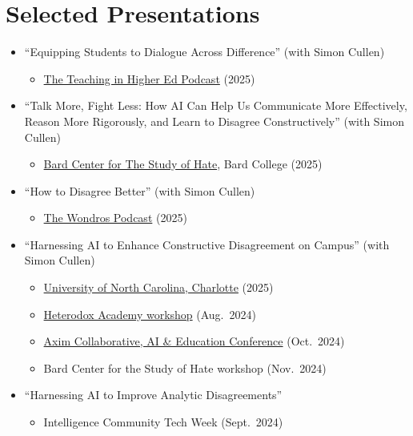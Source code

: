 \documentclass[11pt,letterpaper]{article}
\begin{document}
\section*{Selected Presentations}
\begin{itemize}
    \item ``Equipping Students to Dialogue Across Difference'' (with Simon Cullen)
    \begin{itemize}
        \item \href{https://teachinginhighered.com/podcast/equip-students-to-dialog-across-differences-using-an-ai-guide/}{The Teaching in Higher Ed Podcast} (2025)
    \end{itemize}

    \item ``Talk More, Fight Less: How AI Can Help Us Communicate More Effectively, Reason More Rigorously, and Learn to Disagree Constructively'' (with Simon Cullen)
    \begin{itemize}
        \item \href{https://www.youtube.com/watch?v=yenpEKRVaNY&t=1494s}{Bard Center for The Study of Hate}, Bard College (2025)
    \end{itemize}

    \item ``How to Disagree Better'' (with Simon Cullen)
    \begin{itemize}
        \item \href{https://wondros.com/podcast}{The Wondros Podcast} (2025)
    \end{itemize}

    \item ``Harnessing AI to Enhance Constructive Disagreement on Campus'' (with Simon Cullen)
    \begin{itemize}
        \item \href{https://freeexpression.charlotte.edu}{University of North Carolina, Charlotte} (2025)
        \item \href{https://heterodoxacademy.org/events/harnessing-ai-to-enhance-constructive-disagreement-on-campus-hxa-members-only/}{Heterodox Academy workshop} (Aug.\ 2024)
        \item \href{https://www.axim.org/news/ai-education}{Axim Collaborative, AI \& Education Conference} (Oct.\ 2024)
        \item Bard Center for the Study of Hate workshop (Nov.\ 2024)
    \end{itemize}

    \item ``Harnessing AI to Improve Analytic Disagreements''
    \begin{itemize}
        \item Intelligence Community Tech Week (Sept.\ 2024)
    \end{itemize}


\end{itemize}
\end{document}
